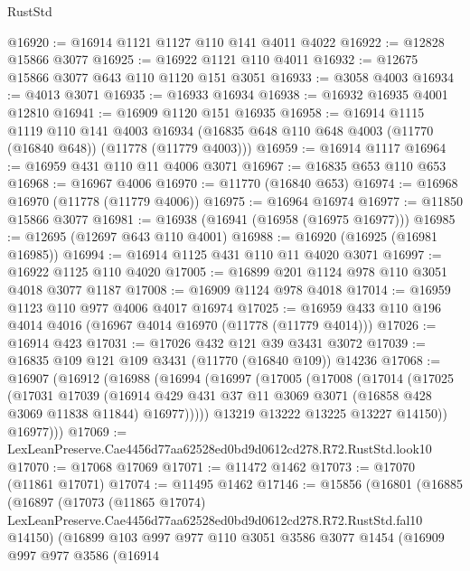 \begin{lexlean}{RustStd}
\begin{coremodule}
@16920 := @16914 @1121 @1127 @110 @141 @4011 @4022
@16922 := @12828 @15866 @3077
@16925 := @16922 @1121 @110 @4011
@16932 := @12675 @15866 @3077 @643 @110 @1120 @151 @3051
@16933 := @3058 @4003
@16934 := @4013 @3071
@16935 := @16933 @16934
@16938 := @16932 @16935 @4001 @12810
@16941 := @16909 @1120 @151 @16935
@16958 := @16914
    @1115
    @1119
    @110
    @141
    @4003
    @16934
    (@16835 @648 @110 @648 @4003 (@11770 (@16840 @648)) (@11778 (@11779 @4003)))
@16959 := @16914 @1117
@16964 := @16959 @431 @110 @11 @4006 @3071
@16967 := @16835 @653 @110 @653
@16968 := @16967 @4006
@16970 := @11770 (@16840 @653)
@16974 := @16968 @16970 (@11778 (@11779 @4006))
@16975 := @16964 @16974
@16977 := @11850 @15866 @3077
@16981 := @16938 (@16941 (@16958 (@16975 @16977)))
@16985 := @12695 (@12697 @643 @110 @4001)
@16988 := @16920 (@16925 (@16981 @16985))
@16994 := @16914 @1125 @431 @110 @11 @4020 @3071
@16997 := @16922 @1125 @110 @4020
@17005 := @16899 @201 @1124 @978 @110 @3051 @4018 @3077 @1187
@17008 := @16909 @1124 @978 @4018
@17014 := @16959 @1123 @110 @977 @4006 @4017 @16974
@17025 := @16959 @433 @110 @196 @4014 @4016 (@16967 @4014 @16970 (@11778 (@11779 @4014)))
@17026 := @16914 @423
@17031 := @17026 @432 @121 @39 @3431 @3072
@17039 := @16835 @109 @121 @109 @3431 (@11770 (@16840 @109)) @14236
@17068 := @16907
    (@16912
      (@16988
        (@16994
          (@16997
            (@17005
              (@17008
                (@17014
                  (@17025
                    (@17031
                      @17039
                      (@16914
                        @429
                        @431
                        @37
                        @11
                        @3069
                        @3071
                        (@16858 @428 @3069 @11838 @11844)
                        @16977)))))
              @13219
              @13222
              @13225
              @13227
              @14150))
          @16977)))
@17069 := LexLeanPreserve.Cae4456d77aa62528ed0bd9d0612cd278.R72.RustStd.look10
@17070 := @17068 @17069
@17071 := @11472 @1462
@17073 := @17070 (@11861 @17071)
@17074 := @11495 @1462
@17146 := @15856
    (@16801
      (@16885
        (@16897
          (@17073
            (@11865 @17074)
            LexLeanPreserve.Cae4456d77aa62528ed0bd9d0612cd278.R72.RustStd.fal10
            @14150)
          (@16899
            @103
            @997
            @977
            @110
            @3051
            @3586
            @3077
            @1454
            (@16909
              @997
              @977
              @3586
              (@16914

\end{coremodule}
\end{lexlean}
